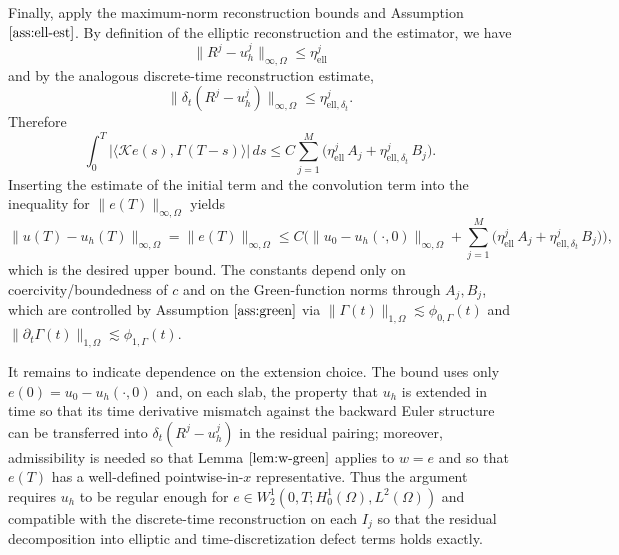 \documentclass[11pt]{article}
\begin{document}
Finally, apply the maximum-norm reconstruction bounds and Assumption \(\ref{ass:ell-est}\). By definition of the elliptic reconstruction and the estimator, we have
\[
\|R^j-u_h^j\|_{\infty,\Omega}\le \eta_\mathrm{ell}^j
\]
and by the analogous discrete-time reconstruction estimate,
\[
\|\delta_t(R^j-u_h^j)\|_{\infty,\Omega}\le \eta_{\mathrm{ell},\delta_t}^j.
\]
Therefore
\[
\int_0^T \big|\langle\mathcal K e(s),\Gamma(T-s)\rangle\big|\,ds
\le C\sum_{j=1}^M\Big(\eta_\mathrm{ell}^j\,A_j+\eta_{\mathrm{ell},\delta_t}^j\,B_j\Big).
\]
Inserting the estimate of the initial term and the convolution term into the inequality for \(\|e(T)\|_{\infty,\Omega}\) yields
\[
\|u(T)-u_h(T)\|_{\infty,\Omega}=\|e(T)\|_{\infty,\Omega}
\le C\Big(\|u_0-u_h(\cdot,0)\|_{\infty,\Omega}+\sum_{j=1}^M \big( \eta_\mathrm{ell}^j\,A_j+\eta_{\mathrm{ell},\delta_t}^j\,B_j\big)\Big),
\]
which is the desired upper bound. The constants depend only on coercivity/boundedness of $c$ and on the Green-function norms through \(A_j,B_j\), which are controlled by Assumption \(\ref{ass:green}\) via \(\|\Gamma(t)\|_{1,\Omega}\lesssim\phi_{0,\Gamma}(t)\) and \(\|\partial_t\Gamma(t)\|_{1,\Omega}\lesssim\phi_{1,\Gamma}(t)\).

It remains to indicate dependence on the extension choice. The bound uses only \(e(0)=u_0-u_h(\cdot,0)\) and, on each slab, the property that $u_h$ is extended in time so that its time derivative mismatch against the backward Euler structure can be transferred into \(\delta_t(R^j-u_h^j)\) in the residual pairing; moreover, admissibility is needed so that Lemma \(\ref{lem:w-green}\) applies to \(w=e\) and so that \(e(T)\) has a well-defined pointwise-in-$x$ representative. Thus the argument requires $u_h$ to be regular enough for \(e\in W^1_2(0,T;H^1_0(\Omega),L^2(\Omega))\) and compatible with the discrete-time reconstruction on each \(I_j\) so that the residual decomposition into elliptic and time-discretization defect terms holds exactly.
\end{document}
